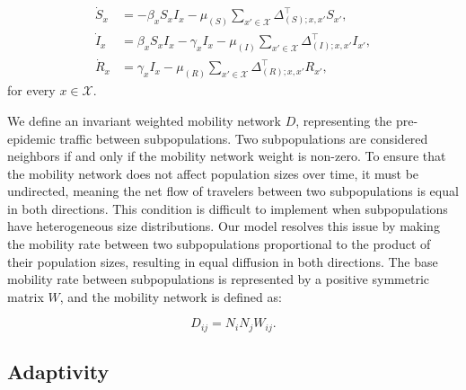 \begin{equation}
\begin{aligned}
    \dot{S}_{x} &= -\beta_{x} S_{x} I_{x} - \mu_{(S)} \sum_{x' \in \mathcal{X}} \Delta_{(S);x,x'}^{\top} S_{x'}, \\
    \dot{I}_{x} &= \beta_{x} S_{x} I_{x} - \gamma_{x} I_{x} - \mu_{(I)} \sum_{x' \in \mathcal{X}} \Delta_{(I);x,x'}^{\top} I_{x'}, \\
    \dot{R}_{x} &= \gamma_{x} I_{x} - \mu_{(R)} \sum_{x' \in \mathcal{X}} \Delta_{(R);x,x'}^{\top} R_{x'},
\end{aligned}
\end{equation}
for every $x \in \mathcal{X}$.

We define an invariant weighted mobility network $D$, representing the pre-epidemic traffic between subpopulations. Two subpopulations are considered neighbors if and only if the mobility network weight is non-zero. To ensure that the mobility network does not affect population sizes over time, it must be undirected, meaning the net flow of travelers between two subpopulations is equal in both directions. This condition is difficult to implement when subpopulations have heterogeneous size distributions. Our model resolves this issue by making the mobility rate between two subpopulations proportional to the product of their population sizes, resulting in equal diffusion in both directions. The base mobility rate between subpopulations is represented by a positive symmetric matrix $W$, and the mobility network is defined as:

\begin{equation}
D_{ij} = N_i N_j W_{ij}.
\end{equation}


\subsection{Adaptivity}

